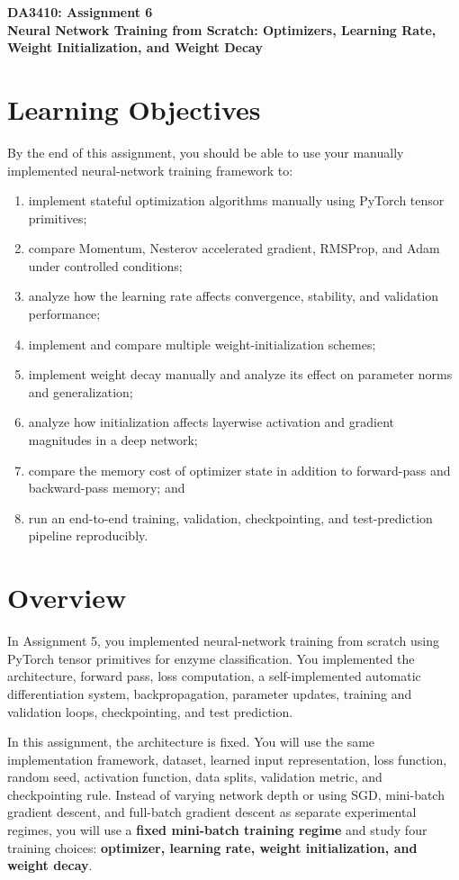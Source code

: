 \documentclass[11pt]{article}
\newcommand{\assignmentnumber}{6}
\begin{document}
\begin{center}
    {\Large \textbf{DA3410: Assignment \assignmentnumber}}\\[0.25em]
    {\large \textbf{Neural Network Training from Scratch: Optimizers, Learning Rate, Weight Initialization, and Weight Decay}}
\end{center}

\section{Learning Objectives}
By the end of this assignment, you should be able to use your manually implemented neural-network training framework to:
\begin{enumerate}
    \item implement stateful optimization algorithms manually using PyTorch tensor primitives;
    \item compare Momentum, Nesterov accelerated gradient, RMSProp, and Adam under controlled conditions;
    \item analyze how the learning rate affects convergence, stability, and validation performance;
    \item implement and compare multiple weight-initialization schemes;
    \item implement weight decay manually and analyze its effect on parameter norms and generalization;
    \item analyze how initialization affects layerwise activation and gradient magnitudes in a deep network;
    \item compare the memory cost of optimizer state in addition to forward-pass and backward-pass memory; and
    \item run an end-to-end training, validation, checkpointing, and test-prediction pipeline reproducibly.
\end{enumerate}

\section{Overview}
In Assignment 5, you implemented neural-network training from scratch using PyTorch tensor primitives for enzyme classification. You implemented the architecture, forward pass, loss computation, a self-implemented automatic differentiation system, backpropagation, parameter updates, training and validation loops, checkpointing, and test prediction.

In this assignment, the architecture is fixed. You will use the same implementation framework, dataset, learned input representation, loss function, random seed, activation function, data splits, validation metric, and checkpointing rule. Instead of varying network depth or using SGD, mini-batch gradient descent, and full-batch gradient descent as separate experimental regimes, you will use a \textbf{fixed mini-batch training regime} and study four training choices: \textbf{optimizer, learning rate, weight initialization, and weight decay}.
\end{document}
